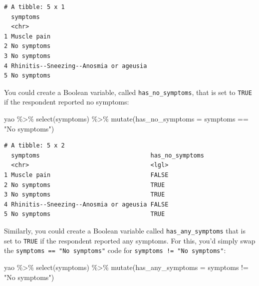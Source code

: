 \documentclass[
  letterpaper,
  DIV=11,
  numbers=noendperiod]{scrreprt}
\newenvironment{Shaded}{\begin{snugshade}}{\end{snugshade}}
\newcommand{\AttributeTok}[1]{\textcolor[rgb]{0.40,0.45,0.13}{#1}}
\newcommand{\FunctionTok}[1]{\textcolor[rgb]{0.28,0.35,0.67}{#1}}
\newcommand{\NormalTok}[1]{\textcolor[rgb]{0.00,0.23,0.31}{#1}}
\newcommand{\SpecialCharTok}[1]{\textcolor[rgb]{0.37,0.37,0.37}{#1}}
\newcommand{\StringTok}[1]{\textcolor[rgb]{0.13,0.47,0.30}{#1}}
\begin{document}
\begin{verbatim}
# A tibble: 5 x 1
  symptoms                              
  <chr>                                 
1 Muscle pain                           
2 No symptoms                           
3 No symptoms                           
4 Rhinitis--Sneezing--Anosmia or ageusia
5 No symptoms                           
\end{verbatim}

You could create a Boolean variable, called \texttt{has\_no\_symptoms},
that is set to \texttt{TRUE} if the respondent reported no symptoms:

\begin{Shaded}
\begin{Highlighting}[]
\NormalTok{yao }\SpecialCharTok{\%\textgreater{}\%} 
  \FunctionTok{select}\NormalTok{(symptoms) }\SpecialCharTok{\%\textgreater{}\%} 
  \FunctionTok{mutate}\NormalTok{(}\AttributeTok{has\_no\_symptoms =}\NormalTok{ symptoms }\SpecialCharTok{==} \StringTok{"No symptoms"}\NormalTok{)}
\end{Highlighting}
\end{Shaded}

\begin{verbatim}
# A tibble: 5 x 2
  symptoms                               has_no_symptoms
  <chr>                                  <lgl>          
1 Muscle pain                            FALSE          
2 No symptoms                            TRUE           
3 No symptoms                            TRUE           
4 Rhinitis--Sneezing--Anosmia or ageusia FALSE          
5 No symptoms                            TRUE           
\end{verbatim}

Similarly, you could create a Boolean variable called
\texttt{has\_any\_symptoms} that is set to \texttt{TRUE} if the
respondent reported any symptoms. For this, you'd simply swap the
\texttt{symptoms\ ==\ "No\ symptoms"} code for
\texttt{symptoms\ !=\ "No\ symptoms"}:

\begin{Shaded}
\begin{Highlighting}[]
\NormalTok{yao }\SpecialCharTok{\%\textgreater{}\%} 
  \FunctionTok{select}\NormalTok{(symptoms) }\SpecialCharTok{\%\textgreater{}\%} 
  \FunctionTok{mutate}\NormalTok{(}\AttributeTok{has\_any\_symptoms =}\NormalTok{ symptoms }\SpecialCharTok{!=} \StringTok{"No symptoms"}\NormalTok{)}
\end{Highlighting}
\end{Shaded}
\end{document}
